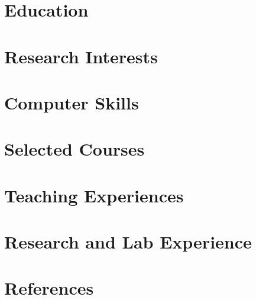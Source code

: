 \documentclass[10pt]{article}
\begin{document}
  \printVersionAndDate
  
  \vspace{-20pt}
  \begin{paracol}{2}
    \section{Education}
      
    \section{Research Interests}
      
    \section{Computer Skills}
      
    \section{Selected Courses}
      
    \section{Teaching Experiences}
      
    \switchcolumn
%      
    \section{Research and Lab Experience}
      
    \section{References}
      
  \end{paracol}
\end{document}
